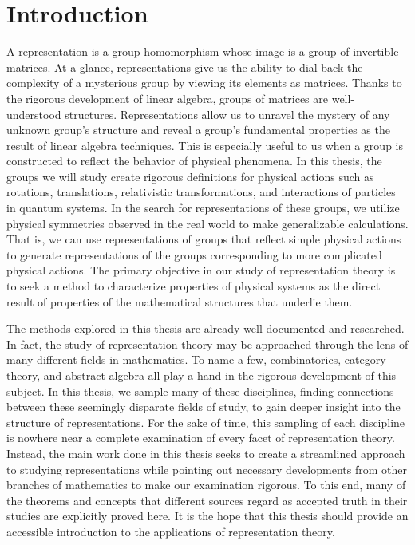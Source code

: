 \chapter{Introduction}

A representation is a group homomorphism whose image is a group of invertible matrices. At a glance, representations give us the ability to dial back the complexity of a mysterious group by viewing its elements as matrices. Thanks to the rigorous development of linear algebra, groups of matrices are well-understood structures. Representations allow us to unravel the mystery of any unknown group's structure and reveal a group’s fundamental properties as the result of linear algebra techniques. This is especially useful to us when a group is constructed to reflect the behavior of physical phenomena. In this thesis, the groups we will study create rigorous definitions for physical actions such as rotations, translations, relativistic transformations, and interactions of particles in quantum systems. In the search for representations of these groups, we utilize physical symmetries observed in the real world to make generalizable calculations. That is, we can use representations of groups that reflect simple physical actions to generate representations of the groups corresponding to more complicated physical actions. The primary objective in our study of representation theory is to seek a method to characterize properties of physical systems as the direct result of properties of the mathematical structures that underlie them.

The methods explored in this thesis are already well-documented and researched. In fact, the study of representation theory may be approached through the lens of many different fields in mathematics. To name a few, combinatorics, category theory, and abstract algebra all play a hand in the rigorous development of this subject. In this thesis, we sample many of these disciplines, finding connections between these seemingly disparate fields of study, to gain deeper insight into the structure of representations. For the sake of time, this sampling of each discipline is nowhere near a complete examination of every facet of representation theory. Instead, the main work done in this thesis seeks to create a streamlined approach to studying representations while pointing out necessary developments from other branches of mathematics to make our examination rigorous. To this end, many of the theorems and concepts that different sources regard as accepted truth in their studies are explicitly proved here. It is the hope that this thesis should provide an accessible introduction to the applications of representation theory.